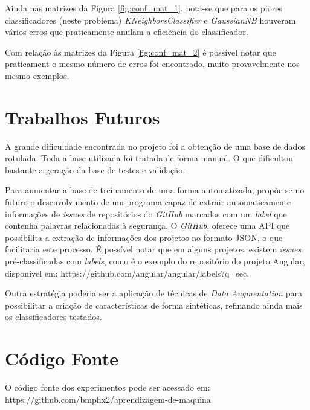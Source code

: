 \documentclass[conference]{IEEEtran}
\begin{document}
Ainda nas matrizes da Figura \ref{fig:conf_mat_1}, nota-se que para os piores classificadores (neste problema) \textit{KNeighborsClassifier} e \textit{GaussianNB} houveram vários erros que praticamente anulam a eficiência do classificador.

Com relação às matrizes da Figura \ref{fig:conf_mat_2} é possível notar que praticament o mesmo número de erros foi encontrado, muito provavelmente nos mesmo exemplos.

\section{Trabalhos Futuros}

A grande dificuldade encontrada no projeto foi a obtenção de uma base de dados rotulada. Toda a base utilizada foi tratada de forma manual. O que dificultou bastante a geração da base de testes e validação.

Para aumentar a base de treinamento de uma forma automatizada, propõe-se no futuro o desenvolvimento de um programa capaz de extrair automaticamente informações de \textit{issues} de repositórios do \textit{GitHub} marcados com um \textit{label} que contenha palavras relacionadas à segurança. O \textit{GitHub}, oferece uma API que possibilita a extração de informações dos projetos no formato JSON, o que facilitaria este processo. É possível notar que em alguns projetos, existem \textit{issues} pré-classificadas com \textit{labels}, como é o exemplo do repositório do projeto Angular, disponível em: https://github.com/angular/angular/labels?q=sec.

Outra estratégia poderia ser a aplicação de técnicas de \textit{Data Augmentation} para possibilitar a criação de características de forma sintéticas, refinando ainda mais os classificadores testados.

\section{Código Fonte}

O código fonte dos experimentos pode ser acessado em: https://github.com/bmphx2/aprendizagem-de-maquina



\end{document}

